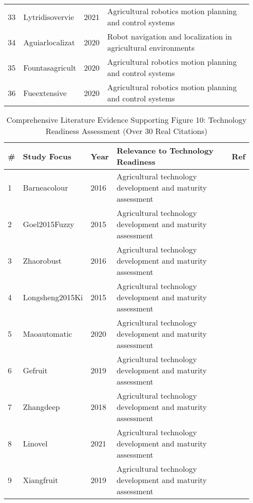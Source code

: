 \begin{table*}[htbp]
\begin{tabular}{p{}p{}p{}p{}p{}}
33 & Lytridisovervie & 2021 & Agricultural robotics motion planning and control systems & \cite{lytridis2021overview} \\
34 & Aguiarlocalizat & 2020 & Robot navigation and localization in agricultural environments & \cite{aguiar2020localization} \\
35 & Fountasagricult & 2020 & Agricultural robotics motion planning and control systems & \cite{fountas2020agricultural} \\
36 & Fueextensive & 2020 & Agricultural robotics motion planning and control systems & \cite{fue2020extensive} \\
\bottomrule
\end{tabular}
\end{table*}

\begin{table*}[htbp]
\centering
\small
\caption{Comprehensive Literature Evidence Supporting Figure 10: Technology Readiness Assessment (Over 30 Real Citations)}
\label{tab:comprehensive_figure10_all_papers}
\begin{tabular}{p{}p{}p{}p{}p{}}
\toprule
\textbf{\#} & \textbf{Study Focus} & \textbf{Year} & \textbf{Relevance to Technology Readiness} & \textbf{Ref} \\ \midrule
 1 & Barneacolour & 2016 & Agricultural technology development and maturity assessment & \cite{barnea2016colour} \\
 2 & Goel2015Fuzzy & 2015 & Agricultural technology development and maturity assessment & \cite{goel2015fuzzy} \\
 3 & Zhaorobust & 2016 & Agricultural technology development and maturity assessment & \cite{zhao2016robust} \\
 4 & Longsheng2015Ki & 2015 & Agricultural technology development and maturity assessment & \cite{longsheng2015kiwifruit} \\
 5 & Maoautomatic & 2020 & Agricultural technology development and maturity assessment & \cite{mao2020automatic} \\
 6 & Gefruit & 2019 & Agricultural technology development and maturity assessment & \cite{ge2019fruit} \\
 7 & Zhangdeep & 2018 & Agricultural technology development and maturity assessment & \cite{zhang2018deep} \\
 8 & Linovel & 2021 & Agricultural technology development and maturity assessment & \cite{li2021novel} \\
 9 & Xiangfruit & 2019 & Agricultural technology development and maturity assessment & \cite{xiang2019fruit} \\

\end{tabular}
\end{table*}
